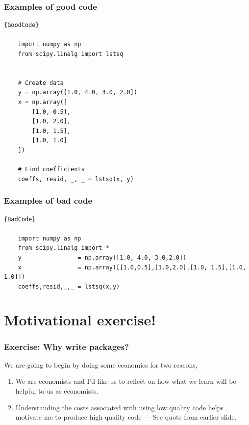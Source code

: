 \documentclass[10pt]{beamer}
\begin{document}
  \begin{frame}[fragile] \frametitle{Examples of good code}

    {\small
    \begin{lstlisting}{GoodCode}

    import numpy as np
    from scipy.linalg import lstsq


    # Create data
    y = np.array([1.0, 4.0, 3.0, 2.0])
    x = np.array([
        [1.0, 0.5],
        [1.0, 2.0],
        [1.0, 1.5],
        [1.0, 1.0]
    ])

    # Find coefficients
    coeffs, resid, _, _ = lstsq(x, y)

    \end{lstlisting}
    }

  \end{frame}

  \begin{frame}[fragile] \frametitle{Examples of bad code}

    {\small
    \begin{lstlisting}{BadCode}

    import numpy as np
    from scipy.linalg import *
    y                = np.array([1.0, 4.0, 3.0,2.0])
    x                = np.array([[1.0,0.5],[1.0,2.0],[1.0, 1.5],[1.0, 1.0]])
    coeffs,resid,_,_ = lstsq(x,y)

    \end{lstlisting}
    }

  \end{frame}



\section{Motivational exercise!}

  \begin{frame} \frametitle{Exercise: Why write packages?}

    We are going to begin by doing some economics for two reasons,

    \begin{enumerate}
      \item We are economists and I'd like us to reflect on how what we learn will
        be helpful to us as economists.
      \item Understanding the costs associated with using low quality code helps
        motivate me to produce high quality code --- See quote from earlier slide.
    \end{enumerate}

  \end{frame}
\end{document}
